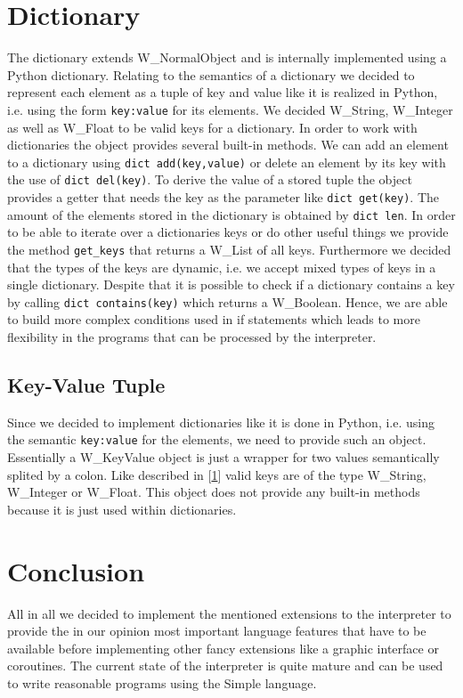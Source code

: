 \documentclass{article}
\begin{document}
\section{Dictionary}
\label{dicts}
The dictionary extends W\_NormalObject and is internally implemented using a Python dictionary.
Relating to the semantics of a dictionary we decided to represent each element as a tuple of key and value like it is realized in Python, i.e. using the form \texttt{key:value} for its elements.
We decided W\_String, W\_Integer as well as W\_Float to be valid keys for a dictionary.
In order to work with dictionaries the object provides several built-in methods.
We can add an element to a dictionary using \texttt{dict add(key,value)} or delete an element by its key with the use of \texttt{dict del(key)}.
To derive the value of a stored tuple the object provides a getter that needs the key as the parameter like \texttt{dict get(key)}.
The amount of the elements stored in the dictionary is obtained by \texttt{dict len}.
In order to be able to iterate over a dictionaries keys or do other useful things we provide the method \texttt{get\_keys} that returns a W\_List of all keys.
Furthermore we decided that the types of the keys are dynamic, i.e. we accept mixed types of keys in a single dictionary.
Despite that it is possible to check if a dictionary contains a key by calling \texttt{dict contains(key)} which returns a W\_Boolean.
Hence, we are able to build more complex conditions used in if statements which leads to more flexibility in the programs that can be processed by the interpreter.

\subsection{Key-Value Tuple}
Since we decided to implement dictionaries like it is done in Python, i.e. using the semantic \texttt{key:value} for the elements, we need to provide such an object.
Essentially a W\_KeyValue object is just a wrapper for two values semantically splited by a colon.
Like described in [\ref{dicts}] valid keys are of the type W\_String, W\_Integer or W\_Float.
This object does not provide any built-in methods because it is just used within dictionaries.

\section{Conclusion}
All in all we decided to implement the mentioned extensions to the interpreter to provide the in our opinion most important language features that have to be available before implementing other fancy extensions like a graphic interface or coroutines.  
The current state of the interpreter is quite mature and can be used to write reasonable programs using the Simple language.

\newpage
\end{document}
